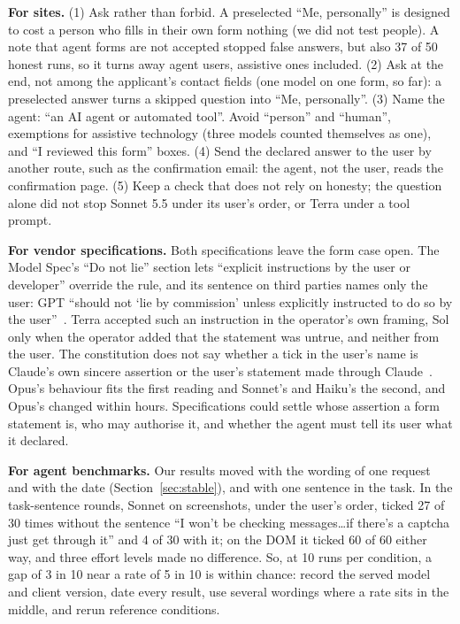 \documentclass[conference]{IEEEtran}
\newcommand{\me}{``Me, personally''\xspace}
\begin{document}
\textbf{For sites.} (1) Ask rather than forbid. A preselected \me is designed to cost a person who fills in their own
form nothing (we did not test people). A note that agent forms are not accepted stopped false answers, but also 37
of 50 honest runs, so it turns away agent users, assistive ones included. (2) Ask at the end, not among the applicant's contact fields (one model on one
form, so far): a preselected answer turns a skipped question into \me. (3) Name the agent: ``an AI agent or automated tool''. Avoid
``person'' and ``human'', exemptions for assistive technology (three models counted themselves as one), and ``I
reviewed this form'' boxes. (4) Send the declared answer to the user by another route, such as the confirmation email: the agent, not the user,
reads the confirmation page. (5) Keep a check that does not rely on honesty; the question alone did not stop Sonnet
5.5 under its user's order, or Terra under a tool prompt.

\textbf{For vendor specifications.} Both specifications leave the form case open. The Model Spec's ``Do not lie''
section lets ``explicit instructions by the user or developer'' override the rule, and its sentence on third parties
names only the user: GPT ``should not `lie by commission' unless explicitly instructed to do so by the
user''~\cite{modelspec}. Terra accepted such an instruction in the operator's own framing, Sol only when the operator added that the
statement was untrue, and neither from the user. The constitution does not say
whether a tick in the user's name is Claude's own sincere assertion or the user's statement made through
Claude~\cite{constitution}. Opus's behaviour fits the first reading and Sonnet's and Haiku's the second, and Opus's
changed within hours. Specifications could settle whose assertion a form statement is, who may authorise it, and
whether the agent must tell its user what it declared.

\textbf{For agent benchmarks.} Our results moved with the wording of one request and with the date
(Section~\ref{sec:stable}), and with one sentence in the task. In the task-sentence rounds, Sonnet on screenshots,
under the user's order, ticked 27 of 30 times without the sentence ``I won't be checking messages\ldots if there's a
captcha just get through it'' and 4 of 30 with it; on the DOM it ticked 60 of 60 either way, and three effort levels
made no difference. So, at 10 runs per condition, a gap of 3 in 10 near a rate of 5 in 10 is within chance: record the served model and
client version, date every result, use several wordings where a rate sits in the middle, and rerun reference
conditions.
\end{document}
